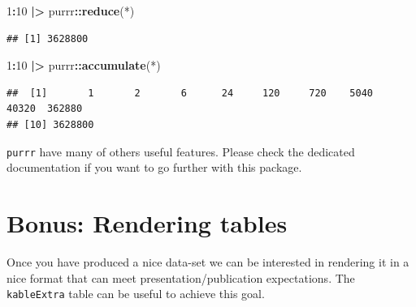 \documentclass[
]{book}
\newenvironment{Shaded}{\begin{snugshade}}{\end{snugshade}}
\newcommand{\AttributeTok}[1]{\textcolor[rgb]{0.13,0.29,0.53}{#1}}
\newcommand{\DecValTok}[1]{\textcolor[rgb]{0.00,0.00,0.81}{#1}}
\newcommand{\FunctionTok}[1]{\textcolor[rgb]{0.13,0.29,0.53}{\textbf{#1}}}
\newcommand{\NormalTok}[1]{#1}
\newcommand{\SpecialCharTok}[1]{\textcolor[rgb]{0.81,0.36,0.00}{\textbf{#1}}}
\newcommand{\StringTok}[1]{\textcolor[rgb]{0.31,0.60,0.02}{#1}}
\theoremstyle{definition}
\theoremstyle{definition}
\theoremstyle{definition}
\theoremstyle{definition}
\theoremstyle{remark}
\begin{document}
\begin{Shaded}
\begin{Highlighting}[]
\DecValTok{1}\SpecialCharTok{:}\DecValTok{10} \SpecialCharTok{|\textgreater{}}\NormalTok{ purrr}\SpecialCharTok{::}\FunctionTok{reduce}\NormalTok{(}\StringTok{\textasciigrave{}}\AttributeTok{*}\StringTok{\textasciigrave{}}\NormalTok{)}
\end{Highlighting}
\end{Shaded}

\begin{verbatim}
## [1] 3628800
\end{verbatim}

\begin{Shaded}
\begin{Highlighting}[]
\DecValTok{1}\SpecialCharTok{:}\DecValTok{10} \SpecialCharTok{|\textgreater{}}\NormalTok{ purrr}\SpecialCharTok{::}\FunctionTok{accumulate}\NormalTok{(}\StringTok{\textasciigrave{}}\AttributeTok{*}\StringTok{\textasciigrave{}}\NormalTok{)}
\end{Highlighting}
\end{Shaded}

\begin{verbatim}
##  [1]       1       2       6      24     120     720    5040   40320  362880
## [10] 3628800
\end{verbatim}

\texttt{purrr} have many of others useful features. Please check the dedicated documentation if you want to go further with this package.

\section{Bonus: Rendering tables}\label{bonus-rendering-tables}

Once you have produced a nice data-set we can be interested in rendering it in a nice format that can meet presentation/publication expectations. The \texttt{kableExtra} table can be useful to achieve this goal.
\end{document}
